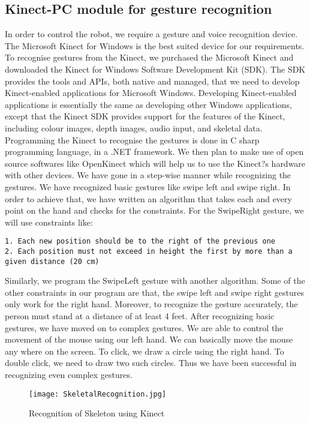 \subsection{Kinect-PC module for gesture recognition}
In order to control the robot, we require a gesture and voice recognition device. The Microsoft Kinect for Windows is the best suited device for our requirements. To recognise gestures from the Kinect, we purchased the Microsoft Kinect and downloaded the Kinect for Windows Software Development Kit (SDK). The SDK provides the tools and APIs, both native and managed, that we need to develop Kinect-enabled applications for Microsoft Windows.
Developing Kinect-enabled applications is essentially the same as developing other Windows applications, except that the Kinect SDK provides support for the features of the Kinect, including colour images, depth images, audio input, and skeletal data. Programming the Kinect to recognise the gestures is done in C sharp programming language, in a .NET framework. We then plan to make use of open source softwares like OpenKinect which will help us to use the Kinect?s hardware with other devices. We have gone in a step-wise manner while recognizing the gestures. We have recognized basic gestures like swipe left and swipe right. In order to achieve that, we have written an algorithm that takes each and every point on the hand and checks for the constraints.
For the SwipeRight gesture, we will use constraints like:
\begin{verbatim}
1. Each new position should be to the right of the previous one
2. Each position must not exceed in height the first by more than a given distance (20 cm)
\end{verbatim}
Similarly, we program the SwipeLeft gesture with another algorithm. Some of the other constraints in our program are that, the swipe left and swipe right gestures only work for the right hand. Moreover, to recognize the gesture accurately, the person must stand at a distance of at least 4 feet. After recognizing basic gestures, we have moved on to complex gestures. We are able to control the movement of the mouse using our left hand. We can basically move the mouse any where on the screen. To click, we draw a circle using the right hand. To double click, we need to draw two such circles. Thus we have been successful in recognizing even complex gestures.

\begin{figure}[H]
  \centering
  \texttt{[image: SkeletalRecognition.jpg]}
  \caption{Recognition of Skeleton using Kinect}
  \label{skeleton}	
\end{figure}

